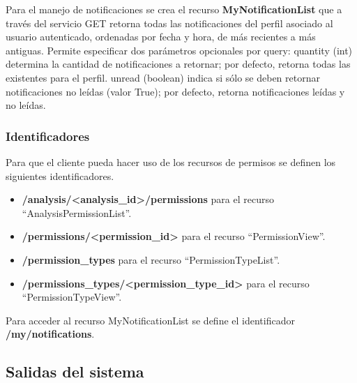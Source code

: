 Para el manejo de notificaciones se crea el recurso \textbf{MyNotificationList} que a través del servicio GET retorna todas las notificaciones del perfil asociado al usuario autenticado, ordenadas por fecha y hora, de más recientes a más antiguas. Permite especificar dos parámetros opcionales por query: quantity (int) determina la cantidad de notificaciones a retornar; por defecto, retorna todas las existentes para el perfil. unread (boolean) indica si sólo se deben retornar notificaciones no leídas (valor True); por defecto, retorna notificaciones leídas y no leídas.

\subsubsection{Identificadores}

	Para que el cliente pueda hacer uso de los recursos de permisos se definen los siguientes identificadores.
	\begin{itemize}
		\item \textbf{/analysis/<analysis\_id>/permissions} para el recurso ``AnalysisPermissionList''.
		\item \textbf{/permissions/<permission\_id>} para el recurso ``PermissionView''.
		\item \textbf{/permission\_types} para el recurso ``PermissionTypeList''.
		\item \textbf{/permissions\_types/<permission\_type\_id>} para el recurso ``PermissionTypeView''.
	\end{itemize}
	
	Para acceder al recurso MyNotificationList se define el identificador \textbf{/my/notifications}.


\subsection{Salidas del sistema}

